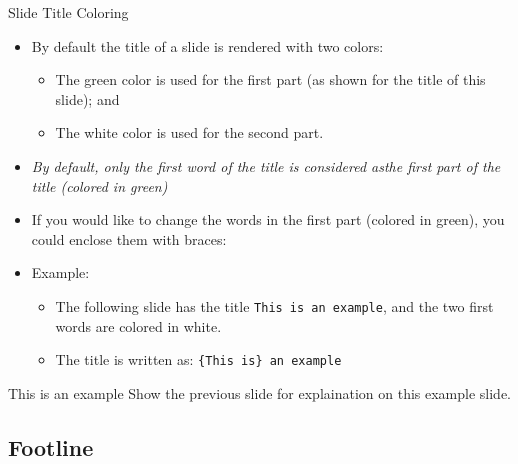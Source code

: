 \documentclass[english,sectioncirclenumberstyle]{ciadbeamer}
\begin{document}
\begin{frame}[t]{Slide Title Coloring}
	\begin{itemize}
	\item By default the title of a slide is rendered with two colors:
		\begin{itemize}
		\item The green color is used for the first part (as shown for the title of this slide); and
		\item The white color is used for the second part.
		\end{itemize}
	\item \emph{By default, only the first word of the title is considered asthe first part of the title (colored in green)}
	\item If you would like to change the words in the first part (colored in green), you could enclose them with braces:
	\item Example:
		\begin{itemize}
		\item The following slide has the title \texttt{This is an example}, and the two first words are colored in white.
		\item The title is written as: \texttt{\{This is\} an example}
		\end{itemize}
	\end{itemize}
\end{frame}

\begin{frame}{{This is} an example}
	Show the previous slide for explaination on this example slide.
\end{frame}

\subsection{Footline}
\end{document}
